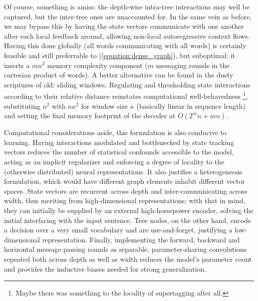 Of course, something is amiss: the depth-wise intra-tree interactions may well be captured, but the inter-tree ones are unaccounted for.
In the same vein as before, we may bypass this by having the state vectors communicate with one another after each local feedback around, allowing non-local autoregressive context flows.
Having this done globally (all words communicating with all words) is certainly feasible and still preferrable to (\ref{equation:dense_graph}), but suboptimal: it inserts a $mn^2$ memory complexity component ($m$ messaging rounds in the cartesian product of words).
A better alternative can be found in the dusty scriptures of old: sliding windows.
Regulating and thresholding state interactions according to their relative distance reinstates computational well-behavedness%
	\footnote{Maybe there was something to the locality of supertagging after all.},
substituting $n^2$ with $n\kappa^2$ for window size $\kappa$ (basically linear in sequence length) and setting the final memory footprint of the decoder at $O(2^mn +mn)$.
	
Computational considerations aside, this formulation is also conducive to learning.
Having interactions modulated and bottlenecked by state tracking vectors reduces the number of statistical confounds accessible to the model, acting as an implicit regularizer and enforcing a degree of locality to the (otherwise distributed) neural representations.
It also justifies a heterogeneous formulation, which would have different graph elements inhabit different vector spaces.
State vectors are recurrent across depth and inter-communicating across width, thus meriting from high-dimensional representations; with that in mind, they can initially be supplied by an external high-horsepower encoder, solving the initial interfacing with the input sentence. 
Tree nodes, on the other hand, encode a decision over a very small vocabulary and are use-and-forget, justifying a low-dimensional representation.
Finally, implementing the forward, backward and horizontal message passing rounds as separable, parameter-sharing convolutions repeated both across depth as well as width reduces the model's parameter count and provides the inductive biases needed for strong generalization.

